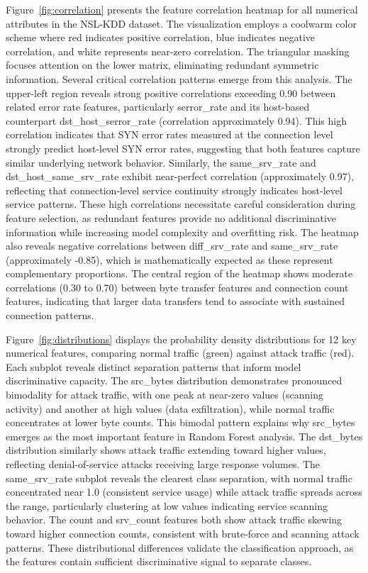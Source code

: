 \documentclass[12pt,a4paper]{report}
\begin{document}
Figure~\ref{fig:correlation} presents the feature correlation heatmap for all numerical attributes in the NSL-KDD dataset. The visualization employs a coolwarm color scheme where red indicates positive correlation, blue indicates negative correlation, and white represents near-zero correlation. The triangular masking focuses attention on the lower matrix, eliminating redundant symmetric information. Several critical correlation patterns emerge from this analysis. The upper-left region reveals strong positive correlations exceeding 0.90 between related error rate features, particularly serror\_rate and its host-based counterpart dst\_host\_serror\_rate (correlation approximately 0.94). This high correlation indicates that SYN error rates measured at the connection level strongly predict host-level SYN error rates, suggesting that both features capture similar underlying network behavior. Similarly, the same\_srv\_rate and dst\_host\_same\_srv\_rate exhibit near-perfect correlation (approximately 0.97), reflecting that connection-level service continuity strongly indicates host-level service patterns. These high correlations necessitate careful consideration during feature selection, as redundant features provide no additional discriminative information while increasing model complexity and overfitting risk. The heatmap also reveals negative correlations between diff\_srv\_rate and same\_srv\_rate (approximately -0.85), which is mathematically expected as these represent complementary proportions. The central region of the heatmap shows moderate correlations (0.30 to 0.70) between byte transfer features and connection count features, indicating that larger data transfers tend to associate with sustained connection patterns.

Figure~\ref{fig:distributions} displays the probability density distributions for 12 key numerical features, comparing normal traffic (green) against attack traffic (red). Each subplot reveals distinct separation patterns that inform model discriminative capacity. The src\_bytes distribution demonstrates pronounced bimodality for attack traffic, with one peak at near-zero values (scanning activity) and another at high values (data exfiltration), while normal traffic concentrates at lower byte counts. This bimodal pattern explains why src\_bytes emerges as the most important feature in Random Forest analysis. The dst\_bytes distribution similarly shows attack traffic extending toward higher values, reflecting denial-of-service attacks receiving large response volumes. The same\_srv\_rate subplot reveals the clearest class separation, with normal traffic concentrated near 1.0 (consistent service usage) while attack traffic spreads across the range, particularly clustering at low values indicating service scanning behavior. The count and srv\_count features both show attack traffic skewing toward higher connection counts, consistent with brute-force and scanning attack patterns. These distributional differences validate the classification approach, as the features contain sufficient discriminative signal to separate classes.
\end{document}
